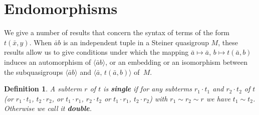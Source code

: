 \documentclass[a4paper, 11pt]{article}
\theoremstyle{note}
\newtheorem{df}[thm]{Definition}
\begin{document}
	\section{Endomorphisms}
	
We give a number of results that concern the syntax of terms of the form $t(\bar{x},y)$. When $\bar{a}b$ is an independent tuple in a Steiner quasigroup $M$, these results allow us to give conditions under which the mapping $\bar{a} \mapsto \bar{a}$, $b \mapsto t(\bar{a},b)$ induces an automorphism of $\langle \bar{a}b \rangle$, or an embedding or an isomorphism between the subquasigroups $\langle\bar{a}b \rangle$ and $\langle \bar{a}, \, t(\bar{a},b) \rangle$ of~$M$.
	
	\begin{df} A subterm $r$ of $t$ is {\bf single} if for any subterms  $r_1\cdot t_1$ and $r_2\cdot t_2$ of $t$ (or $r_1\cdot t_1$, $t_2\cdot r_2$,  or  $t_1\cdot r_1$, $r_2\cdot t_2$ or  $t_1\cdot r_1$, $t_2\cdot r_2$)  with  $r_1\sim r_2\sim r$  we have  $t_1\sim t_2$. Otherwise we call it {\bf double}.
	\end{df}
	
\end{document}
